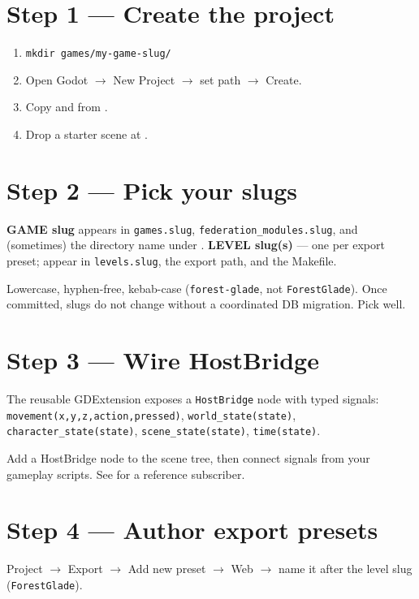 \documentclass[11pt,a4paper,openany]{book}
\begin{document}
\chapter{Step 1 --- Create the project}
\begin{enumerate}
  \item \texttt{mkdir games/my-game-slug/}
  \item Open Godot $\rightarrow$ New Project $\rightarrow$ set path
        $\rightarrow$ Create.
  \item Copy  and
         from
        .
  \item Drop a starter scene at .
\end{enumerate}

\chapter{Step 2 --- Pick your slugs}
\textbf{GAME slug} appears in \texttt{games.slug},
\texttt{federation\_modules.slug}, and (sometimes) the directory name
under . \textbf{LEVEL slug(s)} --- one per export
preset; appear in \texttt{levels.slug}, the export path, and the
Makefile.

Lowercase, hyphen-free, kebab-case (\texttt{forest-glade}, not
\texttt{ForestGlade}). Once committed, slugs do not change without a
coordinated DB migration. Pick well.

\chapter{Step 3 --- Wire HostBridge}
The reusable GDExtension exposes a \texttt{HostBridge} node with typed
signals: \texttt{movement(x,y,z,action,pressed)},
\texttt{world\_state(state)}, \texttt{character\_state(state)},
\texttt{scene\_state(state)}, \texttt{time(state)}.

Add a HostBridge node to the scene tree, then connect signals from your
gameplay scripts. See
for a reference subscriber.

\chapter{Step 4 --- Author export presets}
Project $\rightarrow$ Export $\rightarrow$ Add new preset $\rightarrow$
Web $\rightarrow$ name it after the level slug (\texttt{ForestGlade}).
\end{document}

